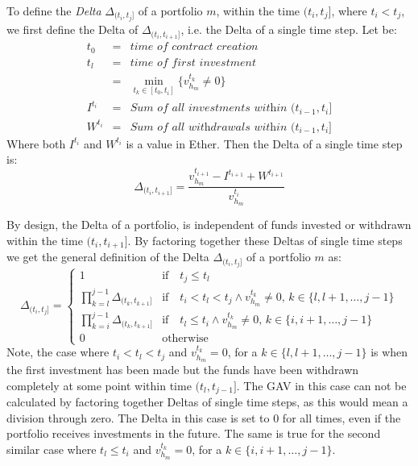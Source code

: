 \documentclass[conference]{IEEEtran}
\begin{document}
To define the \textit{Delta} $\Delta_{(t_i, t_j]}$ of a portfolio $m$, within the time $(t_i, t_j]$, where $t_i < t_j$, we first define the Delta of $\Delta_{(t_i, t_{i+1}]}$, i.e. the Delta of a single time step.
Let be:
\begin{eqnarray*}
	t_0 &=& \textit{time of contract creation} \\
	t_l &=& \textit{time of first investment} \\
	&=& \min_{t_k \in [t_0, t_i]} \{v_{h_m}^{t_k} \neq 0\} \\
	I^{t_i} &=& \textit{Sum of all investments within $(t_{i-1}, t_i]$} \\
	W^{t_i} &=& \textit{Sum of all withdrawals within $(t_{i-1}, t_i]$}
\end{eqnarray*}
Where both $I^{t_i}$ and $W^{t_i}$ is a value in Ether. Then the Delta of a single time step is:
\begin{equation}
\Delta_{(t_i, t_{i+1}]} = 
\frac{v_{h_m}^{t_{i+1}} - 
	I^{t_{i +1}} + W^{t_{i +1}}}{v_{h_m}^{t_i}}
\end{equation}

By design, the Delta of a portfolio, is independent of funds invested or withdrawn within the time $(t_i, t_{i+1}]$. By factoring together these Deltas of single time steps we get the general definition of the Delta $\Delta_{(t_i, t_j]}$ of a portfolio $m$ as:
\begin{equation}
\Delta_{(t_i, t_j]} = \begin{cases}
1 & \text{if} \quad t_j \leq t_l \\
\prod\limits_{k = l}^{j - 1} \Delta_{(t_k, t_{k + 1}]} & \text{if} \quad t_i < t_l < t_j \wedge  v_{h_m}^{t_k} \neq 0, \, k \in \{l, l + 1, \hdots, j - 1\}\\
\prod\limits_{k = i}^{j - 1} \Delta_{(t_k, t_{k + 1}]} & \text{if} \quad t_l \leq t_i \wedge  v_{h_m}^{t_k} \neq 0, \, k \in \{i, i + 1, \hdots, j - 1\}\\
0 & \text{otherwise}
\end{cases}
\end{equation}
Note, the case where $t_i < t_l < t_j$ and $v_{h_m}^{t_k} = 0$, for a $k \in \{l, l + 1, \hdots, j - 1\}$ is when the first investment has been made but the funds have been withdrawn completely at some point within time $(t_l, t_{j-1}]$. The GAV in this case can not be calculated by factoring together Deltas of single time steps, as this would mean a division through zero. The Delta in this case is set to $0$ for all times, even if the portfolio receives investments in the future. The same is true for the second similar case where $t_l \leq t_i$ and $v_{h_m}^{t_k} = 0$, for a $k \in \{i, i + 1, \hdots, j - 1\}$.
\end{document}
